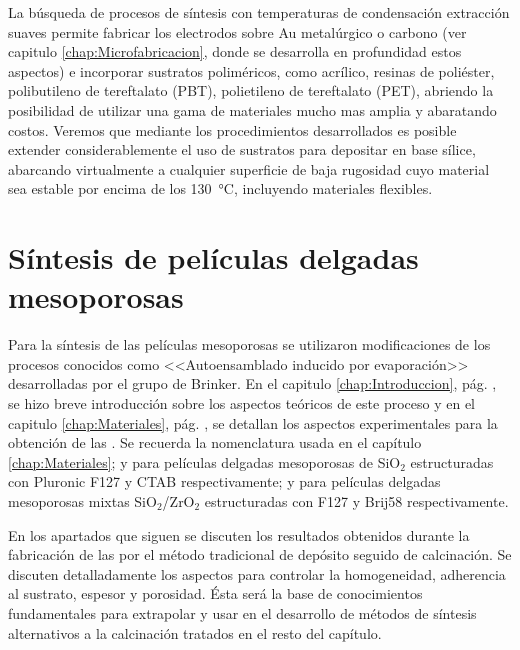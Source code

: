 	La búsqueda de procesos de síntesis con temperaturas de condensación extracción suaves permite fabricar los electrodos sobre Au metalúrgico o carbono (ver capitulo \ref{chap:Microfabricacion}, donde se desarrolla en profundidad estos aspectos) e incorporar sustratos poliméricos, como acrílico, resinas de poliéster, polibutileno de tereftalato (PBT), polietileno de tereftalato (PET), abriendo la posibilidad de utilizar una gama de materiales mucho mas amplia y abaratando costos. Veremos que mediante los procedimientos desarrollados es posible extender considerablemente el uso de sustratos para depositar \pdm\space en base sílice, abarcando virtualmente a cualquier superficie de baja rugosidad cuyo material sea estable por encima de los \SI{130}{\celsius}, incluyendo materiales flexibles.
	
\section{Síntesis de películas delgadas mesoporosas}
		
		Para la síntesis de las películas mesoporosas se utilizaron modificaciones de los procesos conocidos como <<Autoensamblado inducido por evaporación>> desarrolladas por el grupo de Brinker.\cite{Brinker1999} En el capitulo \ref{chap:Introduccion}, pág. \pageref{sec:mesoporosos}, se hizo breve introducción sobre los aspectos teóricos de este proceso y en el capitulo \ref{chap:Materiales}, pág. \pageref{sec:sintesis_mesoporosos}, se detallan los aspectos experimentales para la obtención de las \pdm. Se recuerda la nomenclatura usada en el capítulo \ref{chap:Materiales}; \pdmF\space y \pdmC\space para películas delgadas mesoporosas de SiO$_2$ estructuradas con Pluronic F127 y CTAB respectivamente; \pdmZ\space y \pdmZB\space para películas delgadas mesoporosas mixtas SiO$_2$/ZrO$_2$ estructuradas con F127 y Brij58 respectivamente.

		En los apartados que siguen se discuten los resultados obtenidos durante la fabricación de las \pdm\space por el método tradicional de depósito seguido de calcinación. Se discuten detalladamente los aspectos para controlar la homogeneidad, adherencia al sustrato, espesor y porosidad. Ésta será la base de conocimientos fundamentales para extrapolar y usar en el desarrollo de métodos de síntesis alternativos a la calcinación tratados en el resto del capítulo.

